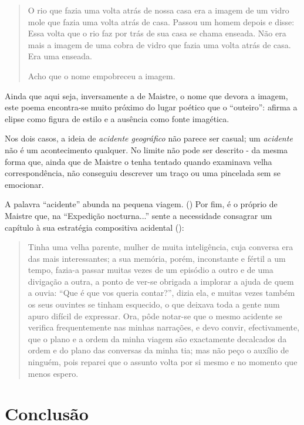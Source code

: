 \documentclass[12pt]{article}
\begin{document}
\begin{quote}
  O rio que fazia uma volta atrás de nossa casa
era a imagem de um vidro mole que fazia uma
volta atrás de casa.
Passou um homem depois e disse: Essa volta
que o rio faz por trás de sua casa se chama
enseada.
Não era mais a imagem de uma cobra de vidro
que fazia uma volta atrás de casa.
Era uma enseada.

Acho que o nome empobreceu a imagem. 
\end{quote}

Ainda que aqui seja, inversamente a de Maistre, o nome que devora a
imagem, este poema encontra-se muito próximo do lugar poético que o
``outeiro'': afirma a elipse como figura de estilo e a ausência como
fonte imagética.

Nos dois casos, a ideia de \emph{acidente geográfico} não parece ser
casual; um \emph{acidente} não é um acontecimento qualquer. No limite
não pode ser descrito - da mesma forma que, ainda que de Maistre o
tenha tentado quando examinava velha correspondência, não conseguiu
descrever um traço ou uma pincelada sem se
emocionar. \cite[p.xxx?]{demaistre}

A palavra ``acidente'' abunda na pequena viagem. (\cite[pxxx, pxxx,
  pxxx, pxxx, pxxx]{demaistre}) Por fim, é o próprio de Maistre que,
na ``Expedição nocturna...''  sente a necessidade consagrar um
capítulo à sua estratégia compositiva acidental
(\cite[p.xxx?]{demaistre}):

\begin{quote}
  Tinha uma velha parente, mulher de muita inteligência, cuja conversa
  era das mais interessantes; a sua memória, porém, inconstante e
  fértil a um tempo, fazia-a passar muitas vezes de um episódio a
  outro e de uma divigação a outra, a ponto de ver-se obrigada a
  implorar a ajuda de quem a ouvia: ``Que é que vos queria contar?'',
  dizia ela, e muitas vezes também os seus ouvintes se tinham
  esquecido, o que deixava toda a gente num apuro difícil de
  expressar. Ora, pôde notar-se que o mesmo acidente se verifica
  frequentemente nas minhas narrações, e devo convir, efectivamente,
  que o plano e a ordem da minha viagem são exactamente decalcados da
  ordem e do plano das conversas da minha tia; mas não peço o auxílio
  de ninguém, pois reparei que o assunto volta por si mesmo e no
  momento que menos espero.
\end{quote}

\section{Conclusão}
\end{document}
